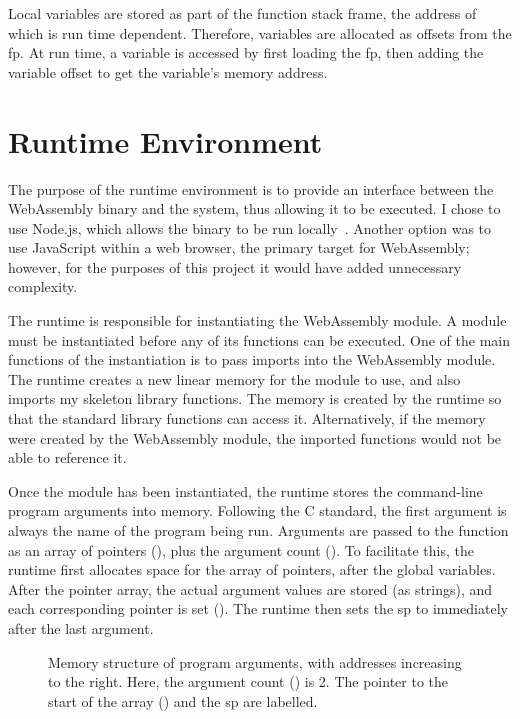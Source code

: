 \documentclass[00-main.tex]{subfiles}
\begin{document}
Local variables are stored as part of the function stack frame, the address of which is run time dependent.
Therefore, variables are allocated as offsets from the \gls{fp}.
At run time, a variable is accessed by first loading the \gls{fp}, then adding the variable offset to get the variable's memory address.

\section{Runtime Environment}\label{sec:impl:runtime}

The purpose of the runtime environment is to provide an interface between the WebAssembly binary and the system, thus allowing it to be executed.
I chose to use Node.js, which allows the binary to be run locally~.
Another option was to use JavaScript within a web browser, the primary target for WebAssembly; however, for the purposes of this project it would have added unnecessary complexity.

The runtime is responsible for instantiating the WebAssembly module.
A module must be instantiated before any of its functions can be executed.
One of the main functions of the instantiation is to pass imports into the WebAssembly module.
The runtime creates a new linear memory for the module to use, and also imports my skeleton library functions.
The memory is created by the runtime so that the standard library functions can access it.
Alternatively, if the memory were created by the WebAssembly module, the imported functions would not be able to reference it.

Once the module has been instantiated, the runtime stores the command-line program arguments into memory.
Following the C standard, the first argument is always the name of the program being run.
Arguments are passed to the  function as an array of  pointers (), plus the argument count ().
To facilitate this, the runtime first allocates space for the array of pointers, after the global variables.
After the pointer array, the actual argument values are stored (as strings), and each corresponding pointer is set ().
The runtime then sets the \gls{sp} to immediately after the last argument.

\begin{figure}[t]
  \centering
  \caption{\protect{}%
    Memory structure of program arguments, with addresses increasing to the right. Here, the argument count () is 2.
    The pointer to the start of the array () and the \gls{sp} are labelled.
  }%
  \label{fig:program args memory structure}
\end{figure}
\end{document}
